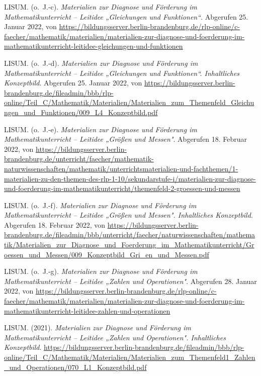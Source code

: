\documentclass[
]{scrbook}
\newlength{\cslhangindent}
\newlength{\cslentryspacingunit} %
\newenvironment{CSLReferences}[2] %
 {%
  \setlength{\parindent}{0pt}
  \ifodd #1
  \let\oldpar\par
  \def\par{\hangindent=\cslhangindent\oldpar}
  \fi
  \setlength{\parskip}{#2\cslentryspacingunit}
 }%
 {}
\theoremstyle{definition}
\theoremstyle{definition}
\theoremstyle{definition}
\theoremstyle{definition}
\theoremstyle{remark}
\begin{document}
\begin{CSLReferences}{1}{0}
\leavevmode{}%
LISUM. (o.~J.-c). \emph{Materialien zur {Diagnose} und {Förderung} im {Mathematikunterricht} -- {Leitidee} „{Gleichungen} und {Funktionen}``}. Abgerufen 25. Januar 2022, von \url{https://bildungsserver.berlin-brandenburg.de/rlp-online/c-faecher/mathematik/materialien/materialien-zur-diagnose-und-foerderung-im-mathematikunterricht-leitidee-gleichungen-und-funktionen}

\leavevmode{}%
LISUM. (o.~J.-d). \emph{Materialien zur {Diagnose} und {Förderung} im {Mathematikunterricht} -- {Leitidee} „{Gleichungen} und {Funktionen}``. {Inhaltliches} {Konzeptbild}}. Abgerufen 25. Januar 2022, von \url{https://bildungsserver.berlin-brandenburg.de/fileadmin/bbb/rlp-online/Teil_C/Mathematik/Materialien/Materialien_zum_Themenfeld_Gleichungen_und_Funktionen/009_L4_Konzeptbild.pdf}

\leavevmode{}%
LISUM. (o.~J.-e). \emph{Materialien zur {Diagnose} und {Förderung} im {Mathematikunterricht} -- {Leitidee} „{Größen} und {Messen}"}. Abgerufen 18. Februar 2022, von \url{https://bildungsserver.berlin-brandenburg.de/unterricht/faecher/mathematik-naturwissenschaften/mathematik/unterrichtsmaterialien-und-fachthemen/1-materialien-zu-den-themen-des-rlp-1-10/sekundarstufe-i/materialien-zur-diagnose-und-foerderung-im-mathematikunterricht/themenfeld-2-groessen-und-messen}

\leavevmode{}%
LISUM. (o.~J.-f). \emph{Materialien zur {Diagnose} und {Förderung} im {Mathematikunterricht} -- {Leitidee} „{Größen} und {Messen}". {Inhaltliches} {Konzeptbild}}. Abgerufen 18. Februar 2022, von \url{https://bildungsserver.berlin-brandenburg.de/fileadmin/bbb/unterricht/faecher/naturwissenschaften/mathematik/Materialien_zur_Diagnose_und_Foerderung_im_Mathematikunterricht/Groessen_und_Messen/009_Konzeptbild_Gri_en_und_Messen.pdf}

\leavevmode{}%
LISUM. (o.~J.-g). \emph{Materialien zur {Diagnose} und {Förderung} im {Mathematikunterricht} -- {Leitidee} „{Zahlen} und {Operationen}"}. Abgerufen 28. Januar 2022, von \url{https://bildungsserver.berlin-brandenburg.de/rlp-online/c-faecher/mathematik/materialien/materialien-zur-diagnose-und-foerderung-im-mathematikunterricht-leitidee-zahlen-und-operationen}

\leavevmode{}%
LISUM. (2021). \emph{Materialien zur {Diagnose} und {Förderung} im {Mathematikunterricht} -- {Leitidee} „{Zahlen} und {Operationen}". {Inhaltliches} {Konzeptbild}}. \url{https://bildungsserver.berlin-brandenburg.de/fileadmin/bbb/rlp-online/Teil_C/Mathematik/Materialien/Materialien_zum_Themenfeld1_Zahlen_und_Operationen/070_L1_Konzeptbild.pdf}


\end{CSLReferences}
\end{document}
